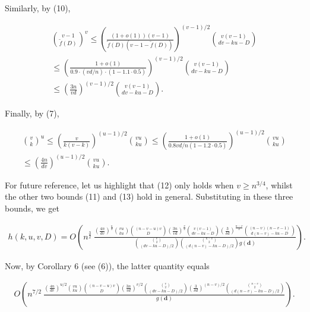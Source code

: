 Similarly, by (10),\par


\[\begin{gathered}
\displaystyle\binom{v-1}{\tilde{f}(D)}^{v} \displaystyle\leq \displaystyle\left(\frac{(1+o(1))(v-1)}{\tilde{f}(D)(v-1-\tilde{f}(D))}\right)^{(v-1)/2}\binom{v(v-1)}{dv-ku-D} \\
\displaystyle\leq \displaystyle\left(\frac{1+o(1)}{0.9\cdot(vd/n)\cdot(1-1.1\cdot 0.5)}\right)^{(v-1)/2}\binom{v(v-1)}{dv-ku-D} \\
\displaystyle\leq \displaystyle\left(\frac{3n}{vd}\right)^{(v-1)/2}\binom{v(v-1)}{dv-ku-D}.
\end{gathered}\]


Finally, by (7),\par


\[\begin{gathered}
\displaystyle\binom{v}{k}^{u} \displaystyle\leq \displaystyle\left(\frac{v}{k(v-k)}\right)^{(u-1)/2}\binom{vu}{ku}\leq\left(\frac{1+o(1)}{0.8vd/n(1-1.2\cdot 0.5)}\right)^{(u-1)/2}\binom{vu}{ku} \\
\displaystyle\leq \displaystyle\left(\frac{4n}{dv}\right)^{(u-1)/2}\binom{vu}{ku}.
\end{gathered}\]




For future reference, let us highlight that (12) only holds when $v\geq n^{3/4}$, whilst the other two bounds (11) and (13) hold in general. Substituting in these three bounds, we get\par


\[\begin{gathered}
h(k,u,v,D)=O\left(n^{\frac{3}{2}}\ \frac{\left(\frac{4n}{dv}\right)^{\frac{u}{2}}\binom{vu}{ku}{(n-v-u)v\choose D}\left(\frac{3n}{vd}\right)^{\frac{v}{2}}\binom{v(v-1)}{dv-ku-D}\left(\frac{3}{\delta d}\right)^{\frac{n-v}{2}}\binom{(n-v)(n-v-1)}{d(n-v)-ku-D}}{\binom{{v\choose 2}}{(dv-ku-D)/2}{{n-v\choose 2}\choose(d(n-v)-ku-D)/2}g(\mathbf{d})}\right).
\end{gathered}\]


Now, by Corollary 6 (see (6)), the latter quantity equals\par


\[\begin{gathered}
O\left(n^{7/2}\ \frac{\left(\frac{4n}{dv}\right)^{u/2}\binom{vu}{ku}{(n-v-u)v\choose D}\left(\frac{3n}{vd}\right)^{v/2}\binom{{v\choose 2}}{(dv-ku-D)/2}\left(\frac{3}{\delta d}\right)^{(n-v)/2}{{n-v\choose 2}\choose(d(n-v)-ku-D)/2}}{g(\mathbf{d})}\right).
\end{gathered}\]


